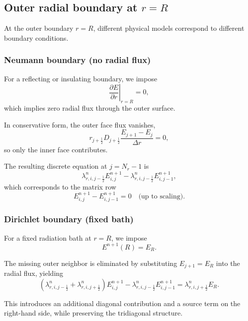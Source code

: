 \documentclass[11pt]{article}
\begin{document}
\subsection{Outer radial boundary at $r=R$}

At the outer boundary $r=R$, different physical models correspond to different
boundary conditions.

\subsubsection{Neumann boundary (no radial flux)}

For a reflecting or insulating boundary, we impose
\begin{equation}
\left.\frac{\partial E}{\partial r}\right|_{r=R} = 0,
\end{equation}
which implies zero radial flux through the outer surface.

In conservative form, the outer face flux vanishes,
\[
r_{j+\frac12} D_{j+\frac12}
\frac{E_{j+1}-E_j}{\Delta r} = 0,
\]
so only the inner face contributes.

The resulting discrete equation at $j=N_r-1$ is
\begin{equation}
\lambda^n_{r,i,j-\frac12} E^{n+1}_{i,j}
-
\lambda^n_{r,i,j-\frac12} E^{n+1}_{i,j-1},
\end{equation}
which corresponds to the matrix row
\[
E^{n+1}_{i,j} - E^{n+1}_{i,j-1} = 0
\quad\text{(up to scaling)}.
\]

\subsubsection{Dirichlet boundary (fixed bath)}

For a fixed radiation bath at $r=R$, we impose
\begin{equation}
E^{n+1}(R) = E_R.
\end{equation}

The missing outer neighbor is eliminated by substituting $E_{j+1}=E_R$ into the
radial flux, yielding
\begin{equation}
\left(
\lambda^n_{r,i,j-\frac12}
+
\lambda^n_{r,i,j+\frac12}
\right) E^{n+1}_{i,j}
-
\lambda^n_{r,i,j-\frac12} E^{n+1}_{i,j-1}
=
\lambda^n_{r,i,j+\frac12} E_R.
\end{equation}

This introduces an additional diagonal contribution and a source term on the
right-hand side, while preserving the tridiagonal structure.
\end{document}
